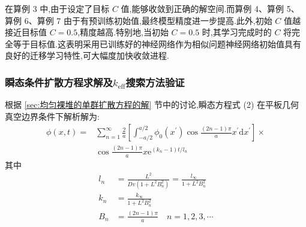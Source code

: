 \documentclass{Sichuan Normal University}
\begin{document}
在算例 3 中,由于设定了目标 $C$ 值,能够收敛到正确的解空间.而算例 4、算例 5、算例 6、算例 7 由于有预训练初始值,最终模型精度进一步提高.此外,初始 $C$ 值越接近目标值 $C=0.5$,精度越高.特别地,当初始 $C=0.5$ 时,其学习完成时的 $C$ 将完全等于目标值.这表明采用已训练好的神经网络作为相似问题神经网络初始值具有良好的迁移学习特性,可大幅度加快收敛进程.

\subsubsection{瞬态条件扩散方程求解及$k_{\text{eff}}$搜索方法验证}

根据 \ref{sec:均匀裸堆的单群扩散方程的解} 节中的讨论,瞬态方程式 (2) 在平板几何真空边界条件下解析解为:
\begin{equation}
\begin{aligned}
\phi(x, t)= & \sum_{n=1}^{\infty} \frac{2}{a}\left[\int_{-a / 2}^{a / 2} \phi_0\left(x^{\prime}\right) \cos \frac{(2 n-1) \pi}{a} x^{\prime} \mathrm{d} x^{\prime}\right] \times \\
& \cos \frac{(2 n-1) \pi}{a} x \mathrm{e}^{\left(k_n-1\right) t / l_n}
\end{aligned}\label{eq:瞬态扩散方程解析解10}
\end{equation}
其中
\begin{align}
l_n&=\frac{L^2}{Dv\left(1+L^2 B_n^2\right)}=\frac{l_{\infty}}{1+L^2 B_n^2}\\
k_n&=\frac{k_{\infty}}{1+L^2 B_n^2}\\
B_n&=\frac{(2 n-1) \pi}{a} \quad n=1,2,3, \cdots
\end{align}
\end{document}

